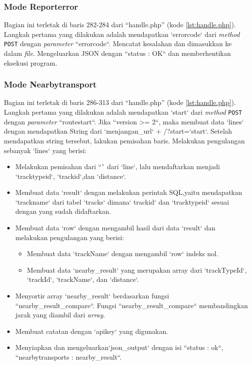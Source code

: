 \subsubsection{Mode Reporterror}
Bagian ini terletak di baris 282-284 dari ``handle.php'' (kode \ref{lst:handle.php}). Langkah pertama yang dilakukan adalah mendapatkan `errorcode` dari \textit{method} \verb!POST! dengan \textit{parameter} ``errorcode``. Mencatat kesalahan dan dimasukkan ke dalam \textit{file}. Mengeluarkan JSON dengan ``status : OK`` dan memberhentikan eksekusi program.

\subsubsection{Mode Nearbytransport}
Bagian ini terletak di baris 286-313 dari ``handle.php'' (kode \ref{lst:handle.php}). Langkah pertama yang dilakukan adalah mendapatkan `start` dari \textit{method} \verb!POST! dengan \textit{parameter} ``routestart``. Jika ``version >= 2``, maka membuat data `lines` dengan mendapatkan String dari `menjangan\_url` + /?start=`start`. Setelah mendapatkan string tersebut, lakukan pemisahan baris. Melakukan pengulangan sebanyak `lines` yang berisi:
\begin{itemize}
	\item Melakukan pemisahan dari ``\`` dari `line`, lalu mendaftarkan menjadi  `tracktypeid`, `trackid`,dan `distance`.
	\item Membuat data `result` dengan melakukan perintah SQL,yaitu mendapatkan `trackname` dari tabel `tracks` dimana` trackid` dan `tracktypeid` sesuai dengan yang sudah didaftarkan.
	\item Membuat data `row` dengan mengambil hasil dari data `result` dan melakukan pengulangan yang berisi:
	\begin{itemize}
		\item Membuat data `trackName` dengan mengambil `row` indeks nol.
		\item Membuat data `nearby\_result` yang merupakan array dari `trackTypeId`, `trackId`, `trackName`, dan `distance`.
	\end{itemize}
	\item Menyortir array `nearby\_result` berdasarkan fungsi ``nearby\_result\_compare``. Fungsi ``nearby\_result\_compare`` membandingkan jarak yang diambil dari \textit{array}.
	\item Membuat catatan dengan `apikey` yang digunakan.
	\item Menyiapkan dan mengeluarkan`json\_output` dengan isi ``status : ok``, ``nearbytransports : nearby\_result``.
	
\end{itemize}

